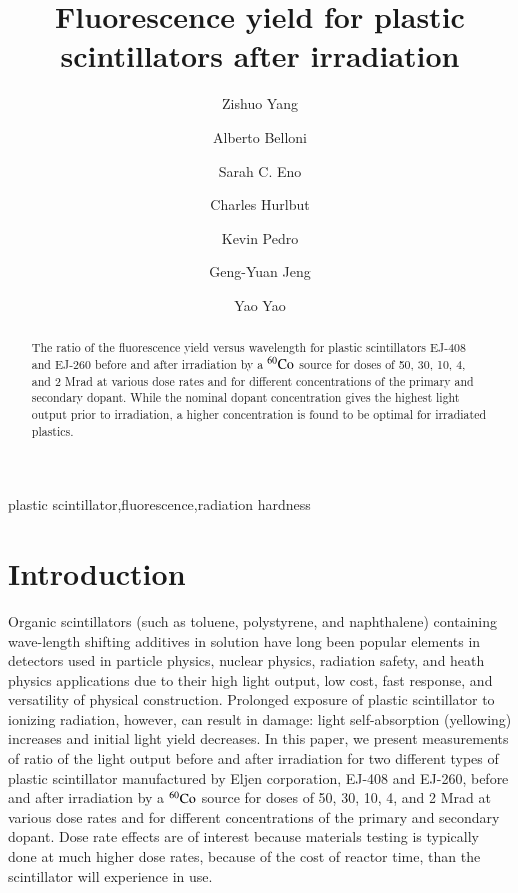 \documentclass[review]{elsarticle}
\begin{document}
\begin{frontmatter}

\title{Fluorescence yield for plastic scintillators after irradiation }


\author[umd]{Zishuo Yang}
\author[umd]{Alberto Belloni}
\author[umd]{Sarah C. Eno}
\author[eljen]{Charles Hurlbut}
\author[fnal]{Kevin Pedro}
\author[umd]{Geng-Yuan Jeng}
\author[umd]{Yao Yao}




\address[umd]{Dept. Physics, U. Maryland, College Park MD 30742 USA}
\address[eljen]{Eljen Technology, 1300 W. Broadway, Sweetwater, Tx 79556 USA}
\address[fnal]{Fermi National Accelerator Laboratory, Batavia, IL, USA}

\begin{abstract}
The ratio of the fluorescence yield versus wavelength for plastic scintillators EJ-408 and EJ-260 before and after irradiation by a $\rm {^{60}Co}$ source for doses of 50, 30, 10, 4, and 2 Mrad at various dose rates and for different concentrations of the primary and secondary dopant.  While the nominal dopant concentration gives the highest light output prior to irradiation, a higher concentration is found to be optimal for irradiated plastics.
\end{abstract}

\begin{keyword}
plastic scintillator\sep fluorescence\sep radiation hardness
\end{keyword}

\end{frontmatter}

\linenumbers

\section{Introduction}
Organic scintillators (such as toluene, polystyrene, and naphthalene) containing wave-length shifting
additives in solution have long been popular elements in detectors used
in particle physics, nuclear physics, radiation safety, and heath physics applications  due to their high light output, low cost, fast response,
and versatility of physical construction. 
Prolonged exposure of plastic scintillator to
ionizing radiation, however, can result in damage:
light self-absorption (yellowing) increases and 
initial light yield decreases.  
In this paper, we present measurements of ratio of the light output before and after irradiation
for two different types of plastic scintillator manufactured by Eljen corporation, EJ-408 and EJ-260, before and after irradiation by a $\rm {^{60}Co}$ source for doses of 50, 30, 10, 4, and 2 Mrad at various dose rates and for different concentrations of the primary and secondary dopant.
Dose rate effects are of interest because materials testing is typically done at much higher dose rates, because of the cost of reactor time, than the scintillator will experience in use.
\end{document}

